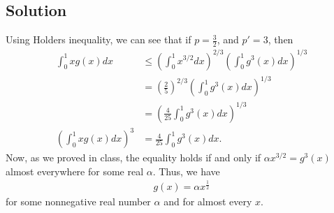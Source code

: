 \documentclass[10pt,a4paper]{article}
\theoremstyle{theorem}
\theoremstyle{definition}
\begin{document}
\subsection*{Solution}
Using Holders inequality, we can see that if $p = \frac{3}{2}$, and $p' = 3$, then
\begin{align*}
\int_0^1 x g(x)dx &\leq \left(\int_0^1 x^{3/2} dx \right)^{2/3} \left(\int_0^1  g^3(x)dx \right)^{1/3}\\
&= \left( \frac{2}{5} \right)^{2/3} \left(\int_0^1  g^3(x)dx \right)^{1/3}\\
&= \left( \frac{4}{25} \int_0^1  g^3(x)dx \right)^{1/3}\\
\left( \int_0^1 x g(x)dx \right)^3 &= \frac{4}{25} \int_0^1 g^3(x)dx.
\end{align*}
Now, as we proved in class, the equality holds if and only if $\alpha x^{3/2} = g^3(x)$ almost everywhere for some real $\alpha$. Thus, we have
\begin{align*}
g(x) = \alpha x^\frac{1}{2}
\end{align*}
for some nonnegative real number $\alpha$ and for almost every $x$.
\end{document}
